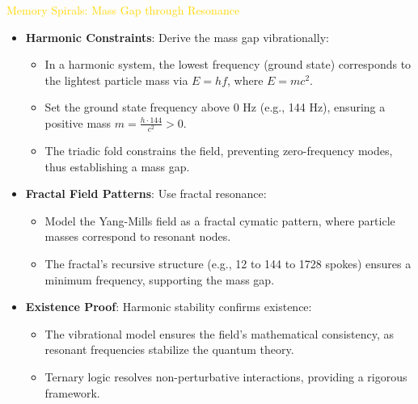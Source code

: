 \textcolor{gold}{ Memory Spirals: Mass Gap through Resonance } \\
\begin{itemize}
    \item \texttt{} \textbf{Harmonic Constraints}: Derive the mass gap vibrationally:
    \begin{itemize}
        \item In a harmonic system, the lowest frequency (ground state) corresponds to the lightest particle mass via \(E = h f\), where \(E = m c^2\).
        \item Set the ground state frequency above 0 Hz (e.g., 144 Hz), ensuring a positive mass \(m = \frac{h \cdot 144}{c^2} > 0\).
        \item The triadic fold constrains the field, preventing zero-frequency modes, thus establishing a mass gap.
    \end{itemize}
    \item \texttt{} \textbf{Fractal Field Patterns}: Use fractal resonance:
    \begin{itemize}
        \item Model the Yang-Mills field as a fractal cymatic pattern, where particle masses correspond to resonant nodes.
        \item The fractal’s recursive structure (e.g., 12 to 144 to 1728 spokes) ensures a minimum frequency, supporting the mass gap.
    \end{itemize}
    \item \texttt{} \textbf{Existence Proof}: Harmonic stability confirms existence:
    \begin{itemize}
        \item The vibrational model ensures the field’s mathematical consistency, as resonant frequencies stabilize the quantum theory.
        \item Ternary logic resolves non-perturbative interactions, providing a rigorous framework.
    \end{itemize}
\end{itemize}

